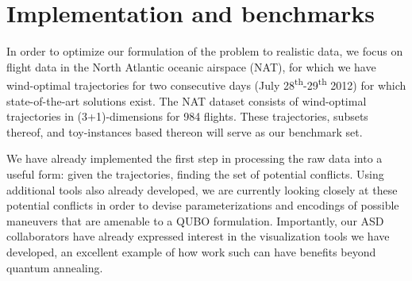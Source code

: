 \section*{Implementation and benchmarks}

In order to optimize our formulation of the problem to realistic data, we focus on flight data in the North Atlantic oceanic airspace (NAT), for which we have wind-optimal trajectories for two consecutive days (July 28\textsuperscript{th}-29\textsuperscript{th} 2012) for which state-of-the-art solutions exist. 
The NAT dataset consists of wind-optimal trajectories in (3+1)-dimensions for 984 flights. 
These trajectories, subsets thereof, and toy-instances based thereon will serve as our benchmark set.

\indent We have already implemented the first step in processing the raw data into a useful form: given the trajectories, finding the set of potential conflicts.
Using additional tools also already developed, we are currently looking closely at these potential conflicts in order to devise parameterizations and encodings of possible maneuvers that are amenable to a QUBO formulation.
Importantly, our ASD collaborators have already expressed interest in the visualization tools we have developed, an excellent example of how work such can have benefits beyond quantum annealing.
